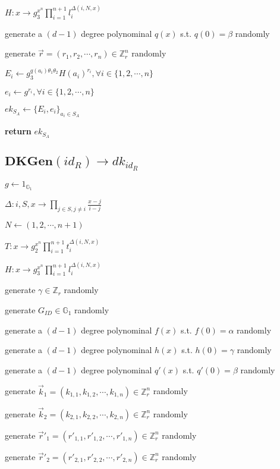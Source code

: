 \documentclass[a4paper]{article}
\begin{document}
$H: x \rightarrow g_3^{x^n} \prod\limits_{i = 1}^{n + 1} l_i^{\Delta(i, N, x)}$

generate a $(d - 1)$ degree polynominal $q(x)$ s.t. $q(0) = \beta$ randomly

generate $\vec{r} = (r_1, r_2, \cdots, r_n) \in \mathbb{Z}_r^n$ randomly

$E_i \gets g_3^{q(a_i) \theta_1 \theta_2} H(a_i)^{r_i}, \forall i \in \{1, 2, \cdots, n\}$

$e_i \gets g^{r_i}, \forall i \in \{1, 2, \cdots, n\}$

$\textit{ek}_{S_A} \gets \{E_i, e_i\}_{a_i \in S_A}$

\textbf{return} $\textit{ek}_{S_A}$

\subsection{$\textbf{DKGen}(\textit{id}_R) \rightarrow \textit{dk}_{\textit{id}_R}$}

$g \gets 1_{\mathbb{G}_1}$

$\Delta: i, S, x \rightarrow \prod\limits_{j \in S, j \neq i} \frac{x - j}{i - j}$

$N \gets (1, 2, \cdots, n + 1)$

$T: x \rightarrow g_2^{x^n} \prod\limits_{i = 1}^{n + 1} t_i^{\Delta(i, N, x)}$

$H: x \rightarrow g_3^{x^n} \prod\limits_{i = 1}^{n + 1} l_i^{\Delta(i, N, x)}$

generate $\gamma \in \mathbb{Z}_r$ randomly

generate $G_{\textit{ID}} \in \mathbb{G}_1$ randomly

generate a $(d - 1)$ degree polynominal $f(x)$ s.t. $f(0) = \alpha$ randomly

generate a $(d - 1)$ degree polynominal $h(x)$ s.t. $h(0) = \gamma$ randomly

generate a $(d - 1)$ degree polynominal $q'(x)$ s.t. $q'(0) = \beta$ randomly

generate $\vec{k}_1 = (k_{1, 1}, k_{1, 2}, \cdots, k_{1, n}) \in \mathbb{Z}_r^n$ randomly

generate $\vec{k}_2 = (k_{2, 1}, k_{2, 2}, \cdots, k_{2, n}) \in \mathbb{Z}_r^n$ randomly

generate $\vec{r}'_1 = (r'_{1, 1}, r'_{1, 2}, \cdots, r'_{1, n}) \in \mathbb{Z}_r^n$ randomly

generate $\vec{r}'_2 = (r'_{2, 1}, r'_{2, 2}, \cdots, r'_{2, n}) \in \mathbb{Z}_r^n$ randomly
\end{document}
